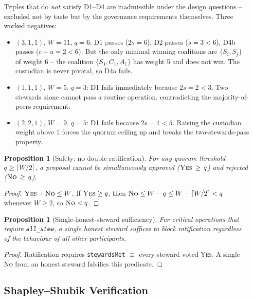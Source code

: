 \documentclass[10pt,twocolumn]{article}
\newtheorem{proposition}[theorem]{Proposition}
\begin{document}
Triples that do \emph{not} satisfy D1--D4 are inadmissible under
the design questions -- excluded not by taste but by the
governance requirements themselves. Three worked negatives:
\begin{itemize}[leftmargin=*,topsep=2pt,itemsep=1pt]
\item $(3,1,1)$, $W=11$, $q=6$: D1 passes ($2s=6$), D2 passes
  ($s=3<6$), D4b passes ($c+a=2<6$). But the only minimal
  winning coalitions are $\{S_i, S_j\}$ of weight 6 -- the
  coalition $\{S_1,C_1,A_1\}$ has weight 5 and does not win.
  The custodian is never pivotal, so D4a fails.
\item $(1,1,1)$, $W=5$, $q=3$: D1 fails immediately because
  $2s = 2 < 3$. Two stewards alone cannot pass a routine
  operation, contradicting the majority-of-peers requirement.
\item $(2,2,1)$, $W=9$, $q=5$: D1 fails because $2s = 4 < 5$.
  Raising the custodian weight above 1 forces the quorum ceiling
  up and breaks the two-stewards-pass property.
\end{itemize}

\begin{proposition}[Safety: no double ratification]
\label{prop:safety}
For any quorum threshold $q \geq \lceil W/2 \rceil$, a proposal
cannot be simultaneously approved ($\textsc{Yes}\,\geq\,q$) and
rejected ($\textsc{No}\,\geq\,q$).
\end{proposition}

\begin{proof}
$\textsc{Yes} + \textsc{No} \leq W$. If $\textsc{Yes} \geq q$, then
$\textsc{No} \leq W - q \leq W - \lceil W/2 \rceil < q$ whenever
$W \geq 2$, so $\textsc{No} < q$.
\end{proof}

\begin{proposition}[Single-honest-steward sufficiency]
\label{prop:honest}
For critical operations that require \texttt{all\_stew}, a
single honest steward suffices to block ratification regardless of
the behaviour of all other participants.
\end{proposition}

\begin{proof}
Ratification requires \texttt{stewardsMet} $\equiv$ every steward
voted \textsc{Yes}. A single \textsc{No} from an honest steward
falsifies this predicate.
\end{proof}

\subsection{Shapley--Shubik Verification}
\label{sec:wqg-shapley}
\end{document}
